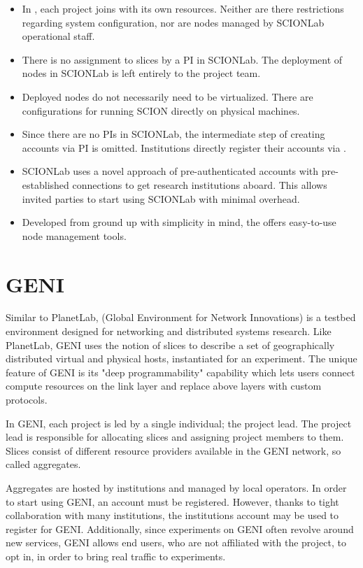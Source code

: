 \begin{itemize}
	\item In \lee, each project joins with its own resources. Neither are there restrictions regarding system configuration, nor are nodes managed by SCIONLab operational staff.
	\item There is no assignment to slices by a PI in SCIONLab. The deployment of nodes in SCIONLab is left entirely to the project team.
	\item Deployed nodes do not necessarily need to be virtualized. There are configurations for running SCION directly on physical machines.
	\item Since there are no PIs in SCIONLab, the intermediate step of creating accounts via PI is omitted. Institutions directly register their accounts via \lcs.
	\item SCIONLab uses a novel approach of pre-authenticated accounts with pre-established connections to get research institutions aboard. This allows invited parties to start using SCIONLab with minimal overhead.
	\item Developed from ground up with simplicity in mind, the \lee offers easy-to-use node management tools.
\end{itemize}

\section{GENI}

Similar to PlanetLab,  (Global Environment for Network Innovations) is a testbed environment designed for networking and distributed systems research. Like PlanetLab, GENI uses the notion of slices to describe a set of geographically distributed virtual and physical hosts, instantiated for an experiment. The unique feature of GENI is its "deep programmability" capability which lets users connect compute resources on the link layer and replace above layers with custom protocols. \cite{geni}

In GENI, each project is led by a single individual; the project lead. The project lead is responsible for allocating slices and assigning project members to them. Slices consist of different resource providers available in the GENI network, so called aggregates.

Aggregates are hosted by institutions and managed by local operators. In order to start using GENI, an account must be registered. However, thanks to tight collaboration with many institutions, the institutions account may be used to register for GENI. Additionally, since experiments on GENI often revolve around new services, GENI allows end users, who are not affiliated with the project, to opt in, in order to bring real traffic to experiments. \cite{geni}



